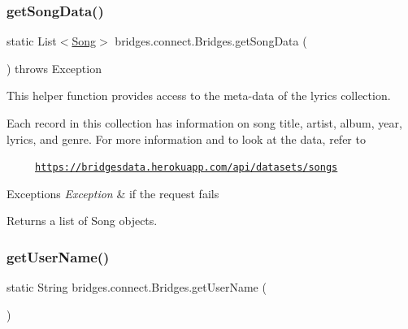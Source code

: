 \mbox{\label{classbridges_1_1connect_1_1_bridges_a5bcfed7f065d3c9da31e3551bf31ec7c}} 
\subsubsection{\texorpdfstring{get\+Song\+Data()}{getSongData()}}
{\footnotesize\ttfamily static List$<$\mbox{\hyperlink{classbridges_1_1data__src__dependent_1_1_song}{Song}}$>$ bridges.\+connect.\+Bridges.\+get\+Song\+Data (\begin{DoxyParamCaption}{ }\end{DoxyParamCaption}) throws Exception\hspace{0.3cm}{\ttfamily [static]}}

This helper function provides access to the meta-\/data of the lyrics collection.

Each record in this collection has information on song title, artist, album, year, lyrics, and genre. For more information and to look at the data, refer to 

~~~~~\href{https://bridgesdata.herokuapp.com/api/datasets/songs}{\tt https\+://bridgesdata.\+herokuapp.\+com/api/datasets/songs} 


\begin{DoxyExceptions}{Exceptions}
{\em Exception} & if the request fails\\
\hline
\end{DoxyExceptions}
\begin{DoxyReturn}{Returns}
a list of Song objects. 
\end{DoxyReturn}
\mbox{\label{classbridges_1_1connect_1_1_bridges_a75f047cda3100e0cfa88378293c12961}} 
\subsubsection{\texorpdfstring{get\+User\+Name()}{getUserName()}}
{\footnotesize\ttfamily static String bridges.\+connect.\+Bridges.\+get\+User\+Name (\begin{DoxyParamCaption}{ }\end{DoxyParamCaption})\hspace{0.3cm}{\ttfamily [static]}}

